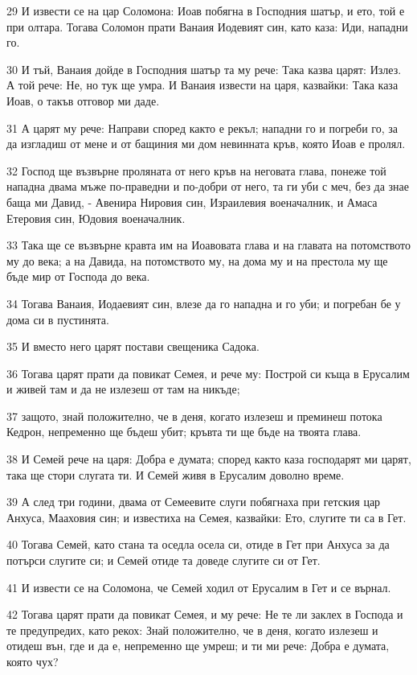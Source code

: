 \par 29 И извести се на цар Соломона: Иоав побягна в Господния шатър, и ето, той е при олтара. Тогава Соломон прати Ванаия Иодевият син, като каза: Иди, нападни го.
\par 30 И тъй, Ванаия дойде в Господния шатър та му рече: Така казва царят: Излез. А той рече: Не, но тук ще умра. И Ванаия извести на царя, казвайки: Така каза Иоав, о такъв отговор ми даде.
\par 31 А царят му рече: Направи според както е рекъл; нападни го и погреби го, за да изгладиш от мене и от бащиния ми дом невинната кръв, която Иоав е пролял.
\par 32 Господ ще възвърне проляната от него кръв на неговата глава, понеже той нападна двама мъже по-праведни и по-добри от него, та ги уби с меч, без да знае баща ми Давид, - Авенира Нировия син, Израилевия военачалник, и Амаса Етеровия син, Юдовия военачалник.
\par 33 Така ще се възвърне кравта им на Иоавовата глава и на главата на потомството му до века; а на Давида, на потомството му, на дома му и на престола му ще бъде мир от Господа до века.
\par 34 Тогава Ванаия, Иодаевият син, влезе да го нападна и го уби; и погребан бе у дома си в пустинята.
\par 35 И вместо него царят постави свещеника Садока.
\par 36 Тогава царят прати да повикат Семея, и рече му: Построй си къща в Ерусалим и живей там и да не излезеш от там на никъде;
\par 37 защото, знай положително, че в деня, когато излезеш и преминеш потока Кедрон, непременно ще бъдеш убит; кръвта ти ще бъде на твоята глава.
\par 38 И Семей рече на царя: Добра е думата; според както каза господарят ми царят, така ще стори слугата ти. И Семей живя в Ерусалим доволно време.
\par 39 А след три години, двама от Семеевите слуги побягнаха при гетския цар Анхуса, Мааховия син; и известиха на Семея, казвайки: Ето, слугите ти са в Гет.
\par 40 Тогава Семей, като стана та оседла осела си, отиде в Гет при Анхуса за да потърси слугите си; и Семей отиде та доведе слугите си от Гет.
\par 41 И извести се на Соломона, че Семей ходил от Ерусалим в Гет и се върнал.
\par 42 Тогава царят прати да повикат Семея, и му рече: Не те ли заклех в Господа и те предупредих, като рекох: Знай положително, че в деня, когато излезеш и отидеш вън, где и да е, непременно ще умреш; и ти ми рече: Добра е думата, която чух?
